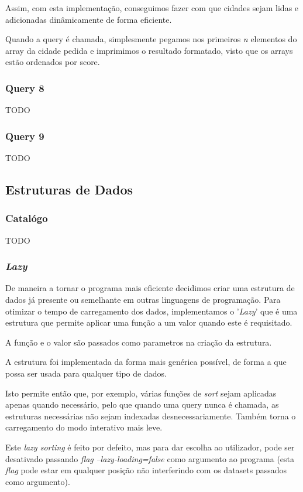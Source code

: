 \documentclass{article}
\begin{document}
            Assim, com esta implementação, conseguimos fazer com que cidades sejam lidas e adicionadas dinâmicamente
            de forma eficiente.

            Quando a query é chamada, simplesmente pegamos nos primeiros \emph{n} elementos do array
            da cidade pedida e imprimimos o resultado formatado, visto que os arrays estão ordenados por score.
        \subsubsection{Query 8}
            TODO
        \subsubsection{Query 9}
            TODO
    \subsection{Estruturas de Dados}
        \subsubsection{Catalógo}
            TODO
        \subsubsection{\emph{Lazy}}
            De maneira a tornar o programa mais eficiente decidimos criar uma
            estrutura de dados já presente ou semelhante em outras linguagens de programação.
            Para otimizar o tempo de carregamento dos dados, implementamos o '\emph{Lazy}' que é uma
            estrutura que permite aplicar uma função a um valor quando este é requisitado.

            A função e o valor são passados como parametros na criação da estrutura.

            A estrutura foi implementada da forma mais genérica possível, de forma a que
            possa ser usada para qualquer tipo de dados.

            Isto permite então que, por exemplo, várias funções de \emph{sort} sejam aplicadas
            apenas quando necessário, pelo que quando uma query nunca é chamada, as estruturas necessárias
            não sejam indexadas desnecessariamente. Também torna o carregamento do modo interativo
            mais leve. 

            Este \emph{lazy sorting} é feito por defeito, mas para dar escolha ao utilizador,
            pode ser desativado passando \emph{flag} \emph{--lazy-loading=false}
            como argumento ao programa (esta \emph{flag} pode estar em qualquer
            posição não interferindo com os datasets passados como argumento).
\end{document}
